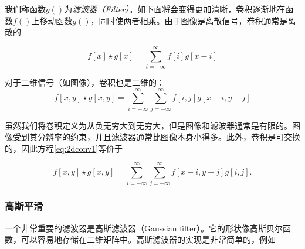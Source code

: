 
我们称函数$g()$为\emph{滤波器（Filter）}。如下面将会变得更加清晰，卷积逐渐地在函数$f()$上移动函数$g()$，同时使两者相乘。由于图像是离散信号，卷积通常是离散的

\begin{equation}
f[x]\star g[x]=\sum_{i=-\infty}^{\infty}f[i]g[x-i]
\end{equation}


对于二维信号（如图像），卷积也是二维的：
\begin{equation}\label{eq:2dconv1}
f[x,y]\star g[x,y]=\sum_{i=-\infty}^{\infty}\sum_{j=-\infty}^{\infty}f[i,j]g[x-i,y-j]
\end{equation}


虽然我们将卷积定义为从负无穷大到无穷大，但是图像和滤波器通常是有限的。图像受到其分辨率的约束，并且滤波器通常比图像本身小得多。此外，卷积是可交换的，因此方程\ref{eq:2dconv1}等价于

\begin{equation}\label{eq:2dconv2}
f[x,y]\star g[x,y]=\sum_{i=-\infty}^{\infty}\sum_{j=-\infty}^{\infty}f[x-i,y-j]g[i,j].
\end{equation}


\subsubsection{高斯平滑}
一个非常重要的滤波器是高斯滤波器（Gaussian filter）。它的形状像高斯贝尔函数，可以容易地存储在二维矩阵中。高斯滤波器的实现是非常简单的，例如


